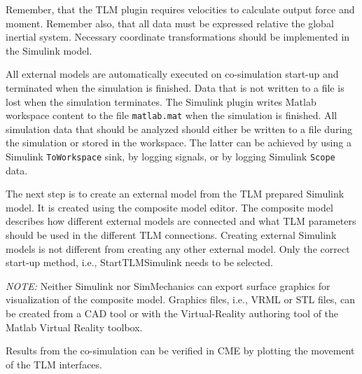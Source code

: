 Remember, that the TLM plugin requires velocities to calculate output force and moment. 
Remember also, that all data must be expressed relative the global inertial system. 
Necessary coordinate transformations should be implemented in the Simulink model.

All external models are automatically executed on co-simulation start-up and terminated when the simulation is finished. 
Data that is not written to a file is lost when the simulation terminates. 
The Simulink plugin writes Matlab workspace content to the file {\tt matlab.mat} when the simulation is
finished. 
All simulation data that should be analyzed should either be written to a file during the simulation or stored in the workspace. 
The latter can be achieved by using a Simulink {\tt ToWorkspace} sink, by logging signals, or by logging Simulink {\tt Scope} data.

The next step is to create an external model from the TLM prepared Simulink model. 
It is created using the composite model editor. 
The composite model describes how different external models are connected and what TLM parameters should be used in the different TLM
connections. 
Creating external Simulink models is not different from creating any other external model. 
Only the correct start-up method, i.e., StartTLMSimulink needs to be selected.

{\em NOTE:} Neither Simulink nor SimMechanics can export surface graphics for visualization of the composite model. 
Graphics files, i.e., VRML or STL files, can be created from a CAD tool or with the Virtual-Reality authoring tool of the Matlab Virtual Reality toolbox.

Results from the co-simulation can be verified in CME by plotting the movement of the TLM interfaces.
